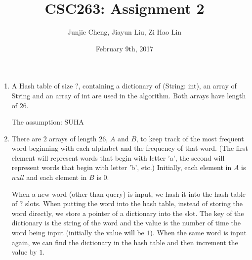 \documentclass[11pt, answers]{exam}
\theoremstyle{plain}
\theoremstyle{definition}
\begin{document}
 


\title{CSC263: Assignment 2}
\date{February 9th, 2017}
\author{Junjie Cheng, Jiayun Liu, Zi Hao Lin}
\maketitle

\unframedsolutions

\begin{questions}
\question
\begin{solution}
\end{solution}

\question
\begin{solution}

\end{solution}


\question
\begin{solution}
\begin{enumerate}
\item A Hash table of size $?$, containing a dictionary of (String: int), an array of String and an array of int are used in the algorithm. Both arrays have length of $26$.

The assumption: SUHA%

\item There are $2$ arrays of length $26$, $A$ and $B$, to keep track of the most frequent word beginning with each alphabet and the frequency of that word. (The first element will represent words that begin with letter 'a', the second will represent words that begin with letter 'b', etc.) Initially, each element in $A$ is $null$ and each element in $B$ is $0$. 

When a new word (other than query) is input, we hash it into the hash table of $?$ slots. When putting the word into the hash table, instead of storing the word directly, we store a pointer of a dictionary into the slot. The key of the dictionary is the string of the word and the value is the number of time the word being input (initially the value will be $1$). When the same word is input again, we can find the dictionary in the hash table and then increment the value by $1$. 


\end{enumerate}
\end{solution}
\end{questions}
\end{document}
